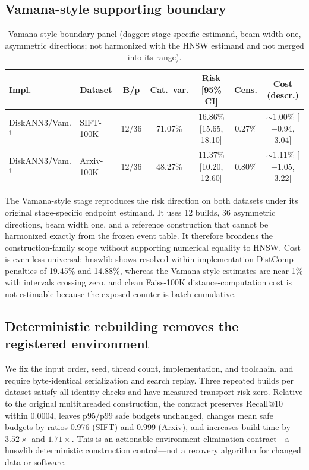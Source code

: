 \documentclass{article}
\begin{document}
\subsection{Vamana-style supporting boundary}

\begin{table}[t]
\centering
\caption{Vamana-style boundary panel (dagger: stage-specific estimand, beam width one, asymmetric
directions; not harmonized with the HNSW estimand and not merged into its range).}
\label{tab:vamana}
\footnotesize
\setlength{\tabcolsep}{2.6pt}
\begin{tabular}{llccccc}
\toprule
Impl. & Dataset & B/p & Cat.\ var. & Risk [95\% CI] & Cens. & Cost (descr.) \\
\midrule
DiskANN3/Vam.$^\dagger$ & SIFT-100K & 12/36 & 71.07\% & 16.86\% {\tiny[15.65, 18.10]} & 0.27\% & $\sim$1.00\% {\tiny[$-$0.94, 3.04]} \\
DiskANN3/Vam.$^\dagger$ & Arxiv-100K & 12/36 & 48.27\% & 11.37\% {\tiny[10.20, 12.60]} & 0.80\% & $\sim$1.11\% {\tiny[$-$1.05, 3.22]} \\
\bottomrule
\end{tabular}
\end{table}

The Vamana-style stage reproduces the risk direction on both datasets under its original stage-specific
endpoint estimand. It uses 12 builds, 36 asymmetric directions, beam width one, and a reference construction
that cannot be harmonized exactly from the frozen event table. It therefore broadens the
construction-family scope without supporting numerical equality to HNSW. Cost is even less universal:
hnswlib shows resolved within-implementation DistComp penalties of 19.45\% and 14.88\%, whereas the
Vamana-style estimates are near 1\% with intervals crossing zero, and clean Faiss-100K distance-computation
cost is not estimable because the exposed counter is batch cumulative.

\subsection{Deterministic rebuilding removes the registered environment}
\label{sec:contract}

We fix the input order, seed, thread count, implementation, and toolchain, and require byte-identical
serialization and search replay. Three repeated builds per dataset satisfy all identity checks and have
measured transport risk zero. Relative to the original multithreaded construction, the contract preserves
Recall@10 within 0.0004, leaves p95/p99 safe budgets unchanged, changes mean safe budgets by ratios 0.976
(SIFT) and 0.999 (Arxiv), and increases build time by $3.52\times$ and $1.71\times$. This is an actionable
environment-elimination contract---a hnswlib deterministic construction control---not a recovery algorithm
for changed data or software.
\end{document}
